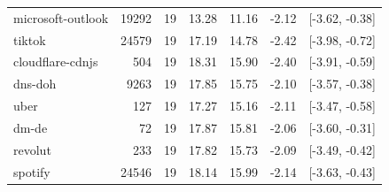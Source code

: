 \begin{longtable}{lrrrrrr}
microsoft-outlook & 19292 & 19 & 13.28 & 11.16 & -2.12 & [-3.62, -0.38]\\
tiktok & 24579 & 19 & 17.19 & 14.78 & -2.42 & [-3.98, -0.72]\\
cloudflare-cdnjs & 504 & 19 & 18.31 & 15.90 & -2.40 & [-3.91, -0.59]\\
dns-doh & 9263 & 19 & 17.85 & 15.75 & -2.10 & [-3.57, -0.38]\\
uber & 127 & 19 & 17.27 & 15.16 & -2.11 & [-3.47, -0.58]\\
dm-de & 72 & 19 & 17.87 & 15.81 & -2.06 & [-3.60, -0.31]\\
revolut & 233 & 19 & 17.82 & 15.73 & -2.09 & [-3.49, -0.42]\\
spotify & 24546 & 19 & 18.14 & 15.99 & -2.14 & [-3.63, -0.43]\\
\end{longtable}\endgroup
